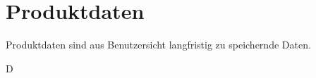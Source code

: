 \section{Produktdaten}%

Produktdaten sind aus Benutzersicht langfristig zu speichernde Daten.%

\begin{reqlist}{D}%
\end{reqlist}%
